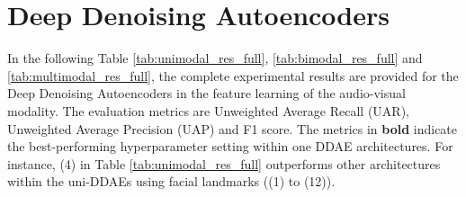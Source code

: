 \section{Deep Denoising Autoencoders}
\label{sec:DDAE_full}

In the following Table \ref{tab:unimodal_res_full}, \ref{tab:bimodal_res_full} and \ref{tab:multimodal_res_full}, the complete experimental results are provided for the Deep Denoising Autoencoders in the feature learning of the audio-visual modality. The evaluation metrics are Unweighted Average Recall (UAR), Unweighted Average Precision (UAP) and F1 score. The metrics in \textbf{bold} indicate the best-performing hyperparameter setting within one DDAE architectures. For instance, (4) in Table \ref{tab:unimodal_res_full} outperforms other architectures within the uni-DDAEs using facial landmarks ((1) to (12)).

